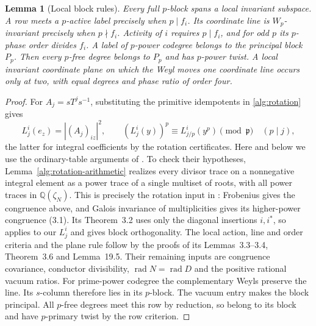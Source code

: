\documentclass[11pt]{amsart}
\numberwithin{equation}{section}
\newtheorem{lemma}[theorem]{Lemma}
\theoremstyle{definition}
\theoremstyle{plain}
\newcommand{\QQ}{\mathbb Q}
\begin{document}
\begin{lemma}[Local block rules]\label{block:admissible}
Every full $p$-block spans a local invariant subspace. A row meets
a $p$-active label precisely when $p\mid f_i$. Its coordinate line
is $W_p$-invariant precisely when $p\nmid f_i$. Activity of $i$
requires $p\mid f_i$, and for odd $p$ its $p$-phase order divides
$f_i$. A label of $p$-power codegree belongs to the principal block
$P_p$. Then every $p$-free degree belongs to $P_p$ and has
$p$-power twist. A local invariant coordinate plane on which the
Weyl moves one coordinate line occurs only at two, with equal degrees
and phase ratio of order four.
\end{lemma}
\begin{proof}
For $A_j=sT^js^{-1}$, substituting the primitive idempotents in
\eqref{alg:rotation} gives
\begin{equation}\label{eq:rotation-entry}
 L_j^i(e_z)=|(A_j)_{iz}|^2,\qquad
 (L_j^i(y))^p\equiv L_{j/p}^i(y^p)\pmod{\mathfrak p}\quad(p\mid j),
\end{equation}
the latter for integral coefficients by the rotation certificates.
Here and below we use the ordinary-table arguments of
\cite[\S\S3,6,19]{BDPcore}. To check their hypotheses,
Lemma~\ref{alg:rotation-arithmetic} realizes every divisor trace on
a nonnegative integral element as a power trace of a single multiset
of roots, with all power traces in $\QQ(\zeta_N)$. This is precisely
the rotation input in \cite[Lemma~3.1]{BDPcore}: Frobenius gives the
congruence above, and Galois invariance of multiplicities gives its
higher-power congruence (3.1). Its Theorem~3.2 uses only the diagonal
insertions $i,i^*$, so applies to our $L^i_j$ and gives block
orthogonality. The local action, line and order criteria and the plane
rule follow by the proofs of its Lemmas~3.3--3.4, Theorem~3.6 and
Lemma~19.5. Their remaining inputs are congruence covariance, conductor
divisibility, $\operatorname{rad}N=\operatorname{rad}D$ and the
positive rational vacuum ratios. For prime-power codegree the
complementary Weyls preserve the line. Its $s$-column therefore
lies in its $p$-block. The vacuum entry makes the block principal.
All $p$-free degrees meet this row by reduction, so belong to its
block and have $p$-primary twist by the row criterion.
\end{proof}
\end{document}
